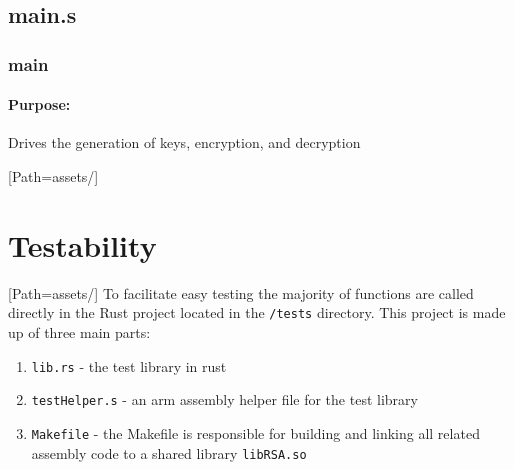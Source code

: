 \documentclass{article}
\begin{document}
    \subsection{main.s}
        \subsubsection{main}
        \paragraph*{Purpose:}
                {Drives the generation of keys, encryption, and decryption }
\newpage

\setmainfont{OpenSans-VariableFont_wdth,wght.ttf}[Path=assets/]
\section{Testability}
\setmainfont{OpenSans-VariableFont_wdth,wght.ttf}[Path=assets/]
    To facilitate easy testing the majority of functions are called directly in the Rust project located
    in the \verb|/tests| directory. This project is made up of three main parts:
    \begin{enumerate}
        \item \verb|lib.rs| - the test library in rust
        \item \verb|testHelper.s| - an arm assembly helper file for the test library
        \item \verb|Makefile| - the Makefile is responsible for building and linking all related assembly code to a shared library  \verb|libRSA.so|
    \end{enumerate}
\end{document}
